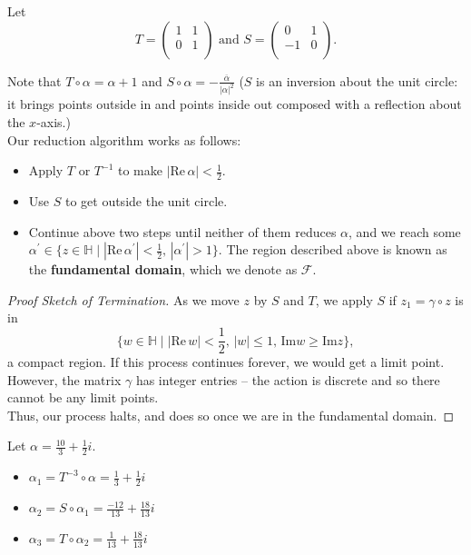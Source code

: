 \documentclass[11pt]{article}
\begin{document}
Let 
\[ T = \begin{pmatrix}
    1 & 1  \\
    0 & 1  \\
\end{pmatrix} \text{ and } 
S = \begin{pmatrix}
    0 & 1  \\
    -1 & 0  \\
\end{pmatrix}.\]

Note that $T \circ \alpha = \alpha + 1$ and $S \circ \alpha = -\frac{\overline{\alpha} }{|\alpha|^2}$ 
($S$ is an inversion about the unit circle: it brings points outside in and points inside out composed with a reflection about the $x$-axis.) \\

Our reduction algorithm works as follows:
\begin{itemize}
    \item Apply $T$ or $T^{-1}$ to make $|\mathrm{Re} \, \alpha| < \frac{1}{2}$.
    \item Use $S$ to get outside the unit circle.
    \item Continue above two steps until neither of them reduces $\alpha$, and we reach some 
    $\alpha^{\prime} \in \{ z \in \mathbb{H} \mid |\mathrm{Re} \, \alpha^{\prime} | < \frac{1}{2}, \, |\alpha^{\prime}| > 1 \}$.
    The region described above is known as the \textbf{fundamental domain}, which we denote as $\mathcal{F}$. 
\end{itemize}

\begin{proof}[Proof Sketch of Termination]
As we move $z$ by $S$ and $T$, we apply $S$ if $z_1 = \gamma \circ z$ is in
\[
    \{ w \in \mathbb{H} \mid |\mathrm{Re} \, w | < \frac{1}{2}, \, |w| \leq 1, \, \mathrm{Im} w \geq  \mathrm{Im} z \}, 
\]
a compact region. If this process continues forever, we would get a limit point. However, the matrix $\gamma$ has integer entries -- the action is discrete
and so there cannot be any limit points. \\

Thus, our process halts, and does so once we are in the fundamental domain.
\end{proof}
\begin{eg}
Let $\alpha = \frac{10}{3} + \frac{1}{2}i$.
\begin{itemize}
    \item $\alpha_1 = T^{-3} \circ \alpha = \frac{1}{3} + \frac{1}{2}i$ 
    \item $\alpha_2 = S \circ \alpha_1 = \frac{-12}{13} + \frac{18}{13}i$
    \item $\alpha_3 = T \circ \alpha_2 = \frac{1}{13} + \frac{18}{13}i$
\end{itemize}
\end{eg}
\end{document}
